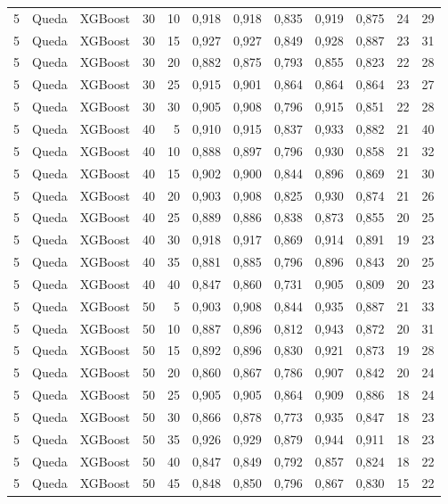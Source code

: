 \begin{longtable}{@{}rllrrrrrrrrr@{}}
5 & Queda & XGBoost & 30 & 10 & 0,918 & 0,918 & 0,835 & 0,919 & 0,875 & 24 & 29 \\
5 & Queda & XGBoost & 30 & 15 & 0,927 & 0,927 & 0,849 & 0,928 & 0,887 & 23 & 31 \\
5 & Queda & XGBoost & 30 & 20 & 0,882 & 0,875 & 0,793 & 0,855 & 0,823 & 22 & 28 \\
5 & Queda & XGBoost & 30 & 25 & 0,915 & 0,901 & 0,864 & 0,864 & 0,864 & 23 & 27 \\
5 & Queda & XGBoost & 30 & 30 & 0,905 & 0,908 & 0,796 & 0,915 & 0,851 & 22 & 28 \\
5 & Queda & XGBoost & 40 & 5 & 0,910 & 0,915 & 0,837 & 0,933 & 0,882 & 21 & 40 \\
5 & Queda & XGBoost & 40 & 10 & 0,888 & 0,897 & 0,796 & 0,930 & 0,858 & 21 & 32 \\
5 & Queda & XGBoost & 40 & 15 & 0,902 & 0,900 & 0,844 & 0,896 & 0,869 & 21 & 30 \\
5 & Queda & XGBoost & 40 & 20 & 0,903 & 0,908 & 0,825 & 0,930 & 0,874 & 21 & 26 \\
5 & Queda & XGBoost & 40 & 25 & 0,889 & 0,886 & 0,838 & 0,873 & 0,855 & 20 & 25 \\
5 & Queda & XGBoost & 40 & 30 & 0,918 & 0,917 & 0,869 & 0,914 & 0,891 & 19 & 23 \\
5 & Queda & XGBoost & 40 & 35 & 0,881 & 0,885 & 0,796 & 0,896 & 0,843 & 20 & 25 \\
5 & Queda & XGBoost & 40 & 40 & 0,847 & 0,860 & 0,731 & 0,905 & 0,809 & 20 & 23 \\
5 & Queda & XGBoost & 50 & 5 & 0,903 & 0,908 & 0,844 & 0,935 & 0,887 & 21 & 33 \\
5 & Queda & XGBoost & 50 & 10 & 0,887 & 0,896 & 0,812 & 0,943 & 0,872 & 20 & 31 \\
5 & Queda & XGBoost & 50 & 15 & 0,892 & 0,896 & 0,830 & 0,921 & 0,873 & 19 & 28 \\
5 & Queda & XGBoost & 50 & 20 & 0,860 & 0,867 & 0,786 & 0,907 & 0,842 & 20 & 24 \\
5 & Queda & XGBoost & 50 & 25 & 0,905 & 0,905 & 0,864 & 0,909 & 0,886 & 18 & 24 \\
5 & Queda & XGBoost & 50 & 30 & 0,866 & 0,878 & 0,773 & 0,935 & 0,847 & 18 & 23 \\
5 & Queda & XGBoost & 50 & 35 & 0,926 & 0,929 & 0,879 & 0,944 & 0,911 & 18 & 23 \\
5 & Queda & XGBoost & 50 & 40 & 0,847 & 0,849 & 0,792 & 0,857 & 0,824 & 18 & 22 \\
5 & Queda & XGBoost & 50 & 45 & 0,848 & 0,850 & 0,796 & 0,867 & 0,830 & 15 & 22 \\

\end{longtable}
